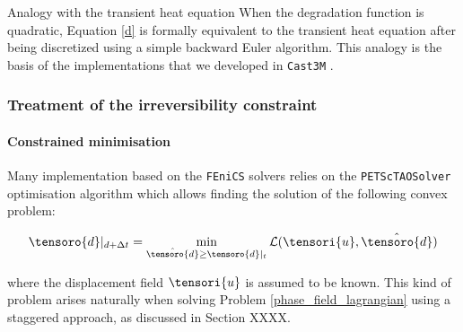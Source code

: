 \begin{infobox}{Analogy with the transient heat equation}
    When the degradation function is quadratic, Equation
    \eqref{d} is formally equivalent to the
    transient heat equation after being discretized
    using a simple backward Euler algorithm.
    This analogy is the basis of the implementations that we developed
    in \texttt{Cast3M}
    \cite{helfer_modelisation_2017, helfer_phase-field_2018, lu_schema_2019}.
\end{infobox}


\subsubsection{Treatment of the irreversibility constraint}

\paragraph{Constrained minimisation}

Many implementation based on the \texttt{FEniCS} solvers
\cite{alessi_gradient_2015, crabbe_etudes_2017, farrell_linear_2017, bleyer_phase-field_2020}
relies on the \texttt{PETScTAOSolver} optimisation algorithm which allows
finding the solution of the following convex problem:

\begin{equation}
    \tensoro{d}\vert_{d + \Delta t}
    =
    \min_{\hat{\tensoro{d}} \geq \tensoro{d}\vert_{t}}
    \mathcal{L}(\tensori{u}, \hat{\tensoro{d}})
\end{equation}


where the displacement field $\tensori{u}$ is assumed to be known. This
kind of problem arises naturally when solving Problem
\eqref{phase_field_lagrangian} using a staggered approach, as discussed in
Section XXXX.

